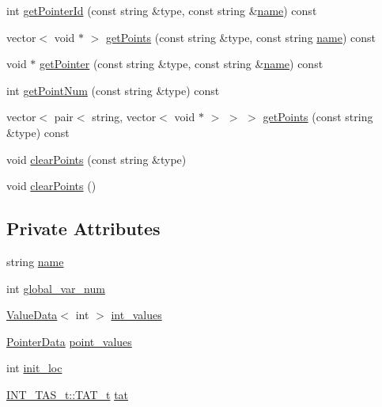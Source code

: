 \begin{DoxyCompactItemize}
int \mbox{\hyperlink{classgraphsat_1_1_uppaal_template_data_a30174d5936a6f73a36556310f1a30a99}{get\+Pointer\+Id}} (const string \&type, const string \&\mbox{\hyperlink{classgraphsat_1_1_uppaal_template_data_ad692037efd6f8c30ec30920cee8fef02}{name}}) const
\item 
vector$<$ void $\ast$ $>$ \mbox{\hyperlink{classgraphsat_1_1_uppaal_template_data_a2292204622aa329e9e65aafb7f628f3c}{get\+Points}} (const string \&type, const string \mbox{\hyperlink{classgraphsat_1_1_uppaal_template_data_ad692037efd6f8c30ec30920cee8fef02}{name}}) const
\item 
void $\ast$ \mbox{\hyperlink{classgraphsat_1_1_uppaal_template_data_ae03ac08e2fac3516a81cc86bfae9b921}{get\+Pointer}} (const string \&type, const string \&\mbox{\hyperlink{classgraphsat_1_1_uppaal_template_data_ad692037efd6f8c30ec30920cee8fef02}{name}}) const
\item 
int \mbox{\hyperlink{classgraphsat_1_1_uppaal_template_data_aeaaf6edf94a9f282e78c25faac74b63e}{get\+Point\+Num}} (const string \&type) const
\item 
vector$<$ pair$<$ string, vector$<$ void $\ast$ $>$ $>$ $>$ \mbox{\hyperlink{classgraphsat_1_1_uppaal_template_data_a76289e5eff0365afcb4b108c9e3af34f}{get\+Points}} (const string \&type) const
\item 
void \mbox{\hyperlink{classgraphsat_1_1_uppaal_template_data_af0588cce20cfbd447cddadabebc2b2a9}{clear\+Points}} (const string \&type)
\item 
void \mbox{\hyperlink{classgraphsat_1_1_uppaal_template_data_a308dd0e29dc2eb35ec12c26597f6929b}{clear\+Points}} ()
\end{DoxyCompactItemize}
\subsection*{Private Attributes}
\begin{DoxyCompactItemize}
\item 
string \mbox{\hyperlink{classgraphsat_1_1_uppaal_template_data_ad692037efd6f8c30ec30920cee8fef02}{name}}
\item 
int \mbox{\hyperlink{classgraphsat_1_1_uppaal_template_data_a5ae3924254d7ff7a275899500898a925}{global\+\_\+var\+\_\+num}}
\item 
\mbox{\hyperlink{classgraphsat_1_1_value_data}{Value\+Data}}$<$ int $>$ \mbox{\hyperlink{classgraphsat_1_1_uppaal_template_data_a50c5d2fefc08d7ca4e7f3ddff363573a}{int\+\_\+values}}
\item 
\mbox{\hyperlink{namespacegraphsat_a107ef8404e59d9b9e5c375face044c42}{Pointer\+Data}} \mbox{\hyperlink{classgraphsat_1_1_uppaal_template_data_aa494d03f747ea40681b1cdbbc3996616}{point\+\_\+values}}
\item 
int \mbox{\hyperlink{classgraphsat_1_1_uppaal_template_data_adf299d4fdc8be051bfa00c11ee17472a}{init\+\_\+loc}}
\item 
\mbox{\hyperlink{classgraphsat_1_1_t_a_s_a5b94c589a76c074601aea1f18bd3d3fe}{I\+N\+T\+\_\+\+T\+A\+S\+\_\+t\+::\+T\+A\+T\+\_\+t}} \mbox{\hyperlink{classgraphsat_1_1_uppaal_template_data_a2a5a9f2dc9ae8437e2917174fc98623f}{tat}}
\end{DoxyCompactItemize}
